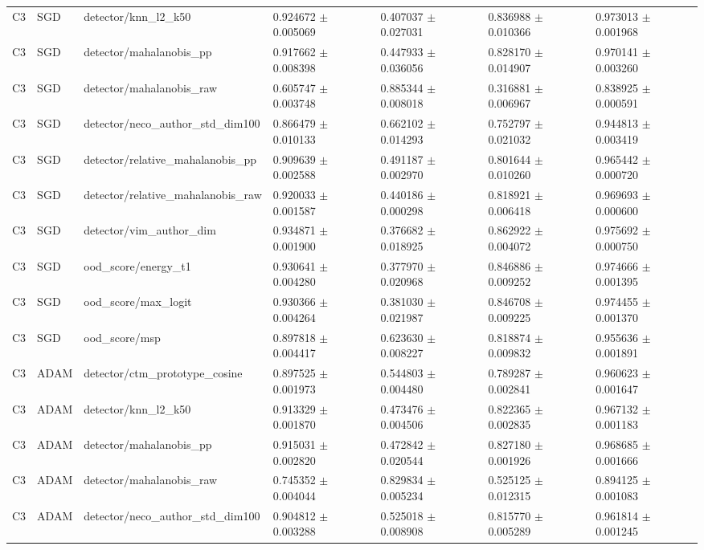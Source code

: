 \begin{longtable}{lllllll}
C3 & SGD & detector/knn\_l2\_k50 & 0.924672 $\pm$ 0.005069 & 0.407037 $\pm$ 0.027031 & 0.836988 $\pm$ 0.010366 & 0.973013 $\pm$ 0.001968 \\
C3 & SGD & detector/mahalanobis\_pp & 0.917662 $\pm$ 0.008398 & 0.447933 $\pm$ 0.036056 & 0.828170 $\pm$ 0.014907 & 0.970141 $\pm$ 0.003260 \\
C3 & SGD & detector/mahalanobis\_raw & 0.605747 $\pm$ 0.003748 & 0.885344 $\pm$ 0.008018 & 0.316881 $\pm$ 0.006967 & 0.838925 $\pm$ 0.000591 \\
C3 & SGD & detector/neco\_author\_std\_dim100 & 0.866479 $\pm$ 0.010133 & 0.662102 $\pm$ 0.014293 & 0.752797 $\pm$ 0.021032 & 0.944813 $\pm$ 0.003419 \\
C3 & SGD & detector/relative\_mahalanobis\_pp & 0.909639 $\pm$ 0.002588 & 0.491187 $\pm$ 0.002970 & 0.801644 $\pm$ 0.010260 & 0.965442 $\pm$ 0.000720 \\
C3 & SGD & detector/relative\_mahalanobis\_raw & 0.920033 $\pm$ 0.001587 & 0.440186 $\pm$ 0.000298 & 0.818921 $\pm$ 0.006418 & 0.969693 $\pm$ 0.000600 \\
C3 & SGD & detector/vim\_author\_dim & 0.934871 $\pm$ 0.001900 & 0.376682 $\pm$ 0.018925 & 0.862922 $\pm$ 0.004072 & 0.975692 $\pm$ 0.000750 \\
C3 & SGD & ood\_score/energy\_t1 & 0.930641 $\pm$ 0.004280 & 0.377970 $\pm$ 0.020968 & 0.846886 $\pm$ 0.009252 & 0.974666 $\pm$ 0.001395 \\
C3 & SGD & ood\_score/max\_logit & 0.930366 $\pm$ 0.004264 & 0.381030 $\pm$ 0.021987 & 0.846708 $\pm$ 0.009225 & 0.974455 $\pm$ 0.001370 \\
C3 & SGD & ood\_score/msp & 0.897818 $\pm$ 0.004417 & 0.623630 $\pm$ 0.008227 & 0.818874 $\pm$ 0.009832 & 0.955636 $\pm$ 0.001891 \\
C3 & ADAM & detector/ctm\_prototype\_cosine & 0.897525 $\pm$ 0.001973 & 0.544803 $\pm$ 0.004480 & 0.789287 $\pm$ 0.002841 & 0.960623 $\pm$ 0.001647 \\
C3 & ADAM & detector/knn\_l2\_k50 & 0.913329 $\pm$ 0.001870 & 0.473476 $\pm$ 0.004506 & 0.822365 $\pm$ 0.002835 & 0.967132 $\pm$ 0.001183 \\
C3 & ADAM & detector/mahalanobis\_pp & 0.915031 $\pm$ 0.002820 & 0.472842 $\pm$ 0.020544 & 0.827180 $\pm$ 0.001926 & 0.968685 $\pm$ 0.001666 \\
C3 & ADAM & detector/mahalanobis\_raw & 0.745352 $\pm$ 0.004044 & 0.829834 $\pm$ 0.005234 & 0.525125 $\pm$ 0.012315 & 0.894125 $\pm$ 0.001083 \\
C3 & ADAM & detector/neco\_author\_std\_dim100 & 0.904812 $\pm$ 0.003288 & 0.525018 $\pm$ 0.008908 & 0.815770 $\pm$ 0.005289 & 0.961814 $\pm$ 0.001245 \\

\end{longtable}
